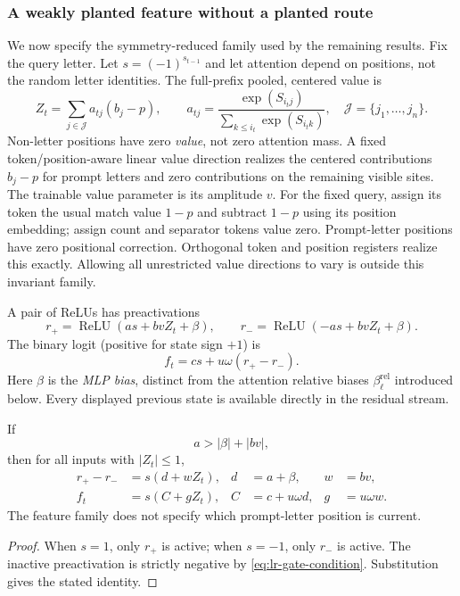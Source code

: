 \subsubsection{A weakly planted feature without a planted route}
\label{app:weak-routing-family}

We now specify the symmetry-reduced family used by the remaining results.
Fix the query letter. Let $s=(-1)^{s_{t-1}}$ and let attention depend on positions, not the
random letter identities.  The full-prefix pooled, centered value is
\begin{equation}\label{eq:lr-centered-value}
 Z_t=\sum_{j\in\mathcal J}a_{tj}(b_j-p),\qquad
 a_{tj}=\frac{\exp(S_{i_tj})}{\sum_{k\le i_t}\exp(S_{i_tk})},
 \quad \mathcal J=\{j_1,\ldots,j_n\}.
\end{equation}
Non-letter positions have zero \emph{value}, not zero attention mass.
A fixed token/position-aware linear value direction realizes the centered contributions
$b_j-p$ for prompt letters and zero contributions on the remaining visible
sites.  The trainable value parameter is its amplitude $v$. For the fixed query, assign its token the usual match
value $1-p$ and subtract $1-p$ using its position embedding; assign count
and separator tokens value zero. Prompt-letter positions have zero positional
correction. Orthogonal token and position registers realize this exactly.
Allowing all
unrestricted value directions to vary is outside this invariant family.

A pair of ReLUs has preactivations
\begin{equation}\label{eq:lr-gates}
 r_+=\operatorname{ReLU}(as+bvZ_t+\beta),\qquad
 r_-=\operatorname{ReLU}(-as+bvZ_t+\beta).
\end{equation}
The binary logit (positive for state sign $+1$) is
\begin{equation}\label{eq:lr-factor-logit}
 f_t=cs+u\omega(r_+-r_-).
\end{equation}
Here $\beta$ is the \emph{MLP bias}, distinct from the attention
relative biases $\beta_\ell^{\mathrm{rel}}$ introduced below.
Every displayed previous state is available directly in the residual stream.

\begin{lrlemma}
\label{lem:lr-two-relu}
If
\begin{equation}\label{eq:lr-gate-condition}
 a>|\beta|+|bv|,
\end{equation}
then for all inputs with $|Z_t|\le1$,
\begin{equation}\label{eq:lr-feature-param}
 \begin{aligned}
 r_+-r_-&=s(d+wZ_t),& d&=a+\beta,& w&=bv,\\
 f_t&=s(C+gZ_t),& C&=c+u\omega d,& g&=u\omega w.
 \end{aligned}
\end{equation}
The feature family does not specify which prompt-letter position is current.
\end{lrlemma}
\begin{proof}
When $s=1$, only $r_+$ is active; when $s=-1$, only $r_-$ is active.
The inactive preactivation is strictly negative by
\eqref{eq:lr-gate-condition}.  Substitution gives the stated identity.
\end{proof}

